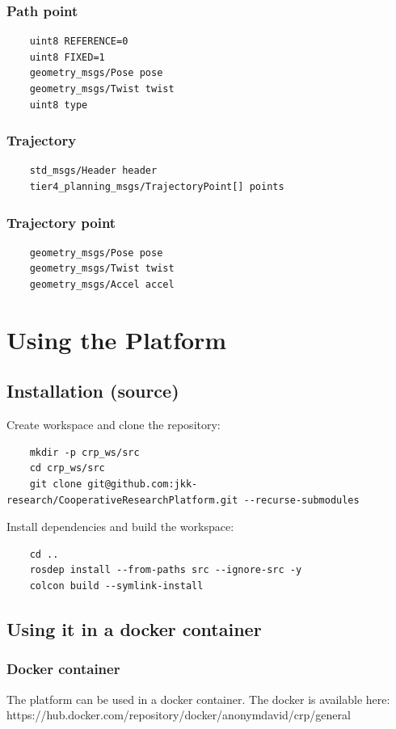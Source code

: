 \documentclass[sn-mathphys-num]{sn-jnl}%
\begin{document}
\subsubsection{Path point}
\begin{lstlisting}
    uint8 REFERENCE=0
    uint8 FIXED=1
    geometry_msgs/Pose pose
    geometry_msgs/Twist twist
    uint8 type
\end{lstlisting}

\subsubsection{Trajectory}
\begin{lstlisting}
    std_msgs/Header header
    tier4_planning_msgs/TrajectoryPoint[] points
\end{lstlisting}

\subsubsection{Trajectory point}
\begin{lstlisting}
    geometry_msgs/Pose pose
    geometry_msgs/Twist twist
    geometry_msgs/Accel accel
\end{lstlisting}

\section{Using the Platform} \label{using_platform}
\subsection{Installation (source)}
Create workspace and clone the repository:
\begin{lstlisting}
    mkdir -p crp_ws/src
    cd crp_ws/src
    git clone git@github.com:jkk-research/CooperativeResearchPlatform.git --recurse-submodules
\end{lstlisting}
Install dependencies and build the workspace:
\begin{lstlisting}
    cd ..
    rosdep install --from-paths src --ignore-src -y
    colcon build --symlink-install
\end{lstlisting}

\subsection{Using it in a docker container}
\subsubsection{Docker container}
The platform can be used in a docker container. The docker is available here: https://hub.docker.com/repository/docker/anonymdavid/crp/general
\end{document}
